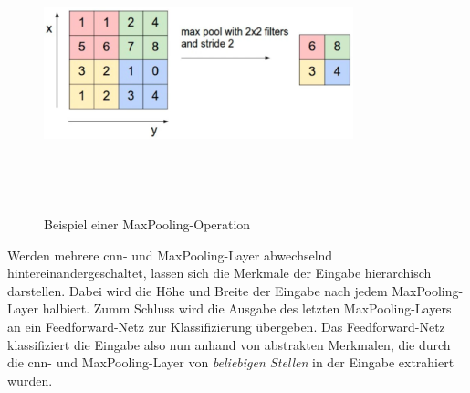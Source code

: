 \begin{figure}[h]
    \centering
    \includegraphics[width=0.8\textwidth,height=8cm,keepaspectratio=true]{content/images/MaxPooling.png}
    \caption{Beispiel einer MaxPooling-Operation \cite{6S191CNN}}
    \label{fig:MaxPooling}
\end{figure}

Werden mehrere \acrshort{cnn}- und MaxPooling-Layer abwechselnd hintereinandergeschaltet, lassen sich die Merkmale der Eingabe hierarchisch darstellen.
Dabei wird die Höhe und Breite der Eingabe nach jedem MaxPooling-Layer halbiert.
Zumm Schluss wird die Ausgabe des letzten MaxPooling-Layers an ein Feedforward-Netz zur Klassifizierung übergeben.
Das Feedforward-Netz klassifiziert die Eingabe also nun anhand von abstrakten Merkmalen, die durch die \acrshort{cnn}- und MaxPooling-Layer von \emph{beliebigen Stellen} in der Eingabe extrahiert wurden.
